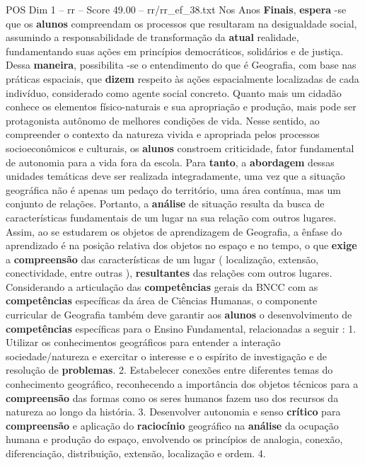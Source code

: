 \begin{textsample}{POS Dim 1 – rr – Score 49.00 – rr/rr\_ef\_38.txt}
Nos Anos \textbf{Finais}, \textbf{espera} -se que os \textbf{alunos} compreendam os processos que resultaram na desigualdade social, assumindo a responsabilidade de transformação da \textbf{atual} realidade, fundamentando suas ações em princípios democráticos, solidários e de justiça.
Dessa \textbf{maneira}, possibilita -se o entendimento do que é Geografia, com base nas práticas espaciais, que \textbf{dizem} respeito às ações espacialmente localizadas de cada indivíduo, considerado como agente social concreto.
Quanto mais um cidadão conhece os elementos físico-naturais e sua apropriação e produção, mais pode ser protagonista autônomo de melhores condições de vida.
Nesse sentido, ao compreender o contexto da natureza vivida e apropriada pelos processos socioeconômicos e culturais, os \textbf{alunos} constroem criticidade, fator fundamental de autonomia para a vida fora da escola.
Para \textbf{tanto}, a \textbf{abordagem} dessas unidades temáticas deve ser realizada integradamente, uma vez que a situação geográfica não é apenas um pedaço do território, uma área contínua, mas um conjunto de relações.
Portanto, a \textbf{análise} de situação resulta da busca de características fundamentais de um lugar na sua relação com outros lugares.
Assim, ao se estudarem os objetos de aprendizagem de Geografia, a ênfase do aprendizado é na posição relativa dos objetos no espaço e no tempo, o que \textbf{exige} a \textbf{compreensão} das características de um lugar ( localização, extensão, conectividade, entre outras ), \textbf{resultantes} das relações com outros lugares.
Considerando a articulação das \textbf{competências} gerais da BNCC com as \textbf{competências} específicas da área de Ciências Humanas, o componente curricular de Geografia também deve garantir aos \textbf{alunos} o desenvolvimento de \textbf{competências} específicas para o Ensino Fundamental, relacionadas a seguir : 1.
Utilizar os conhecimentos geográficos para entender a interação sociedade/natureza e exercitar o interesse e o espírito de investigação e de resolução de \textbf{problemas}. 2.
Estabelecer conexões entre diferentes temas do conhecimento geográfico, reconhecendo a importância dos objetos técnicos para a \textbf{compreensão} das formas como os seres humanos fazem uso dos recursos da natureza ao longo da história. 3.
Desenvolver autonomia e senso \textbf{crítico} para \textbf{compreensão} e aplicação do \textbf{raciocínio} geográfico na \textbf{análise} da ocupação humana e produção do espaço, envolvendo os princípios de analogia, conexão, diferenciação, distribuição, extensão, localização e ordem. 4.

\end{textsample}
